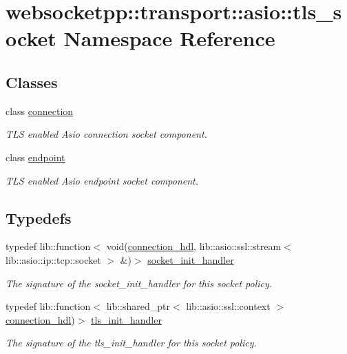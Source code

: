\hypertarget{namespacewebsocketpp_1_1transport_1_1asio_1_1tls__socket}{}\section{websocketpp\+:\+:transport\+:\+:asio\+:\+:tls\+\_\+socket Namespace Reference}
\label{namespacewebsocketpp_1_1transport_1_1asio_1_1tls__socket}
\subsection*{Classes}
\begin{DoxyCompactItemize}
\item 
class \hyperlink{classwebsocketpp_1_1transport_1_1asio_1_1tls__socket_1_1connection}{connection}
\begin{DoxyCompactList}\small\item\em T\+L\+S enabled Asio connection socket component. \end{DoxyCompactList}\item 
class \hyperlink{classwebsocketpp_1_1transport_1_1asio_1_1tls__socket_1_1endpoint}{endpoint}
\begin{DoxyCompactList}\small\item\em T\+L\+S enabled Asio endpoint socket component. \end{DoxyCompactList}\end{DoxyCompactItemize}
\subsection*{Typedefs}
\begin{DoxyCompactItemize}
\item 
typedef lib\+::function$<$ void(\hyperlink{namespacewebsocketpp_a6b3d26a10ee7229b84b776786332631d}{connection\+\_\+hdl}, lib\+::asio\+::ssl\+::stream$<$ lib\+::asio\+::ip\+::tcp\+::socket $>$ \&)$>$ \hyperlink{namespacewebsocketpp_1_1transport_1_1asio_1_1tls__socket_a0ec24de8bf054a4bc6f6c018e743efea}{socket\+\_\+init\+\_\+handler}
\begin{DoxyCompactList}\small\item\em The signature of the socket\+\_\+init\+\_\+handler for this socket policy. \end{DoxyCompactList}\item 
typedef lib\+::function$<$ lib\+::shared\+\_\+ptr$<$ lib\+::asio\+::ssl\+::context $>$\hyperlink{namespacewebsocketpp_a6b3d26a10ee7229b84b776786332631d}{connection\+\_\+hdl})$>$ \hyperlink{namespacewebsocketpp_1_1transport_1_1asio_1_1tls__socket_a6fe279813cc19b05a3897d20f10f16d2}{tls\+\_\+init\+\_\+handler}
\begin{DoxyCompactList}\small\item\em The signature of the tls\+\_\+init\+\_\+handler for this socket policy. \end{DoxyCompactList}\end{DoxyCompactItemize}


